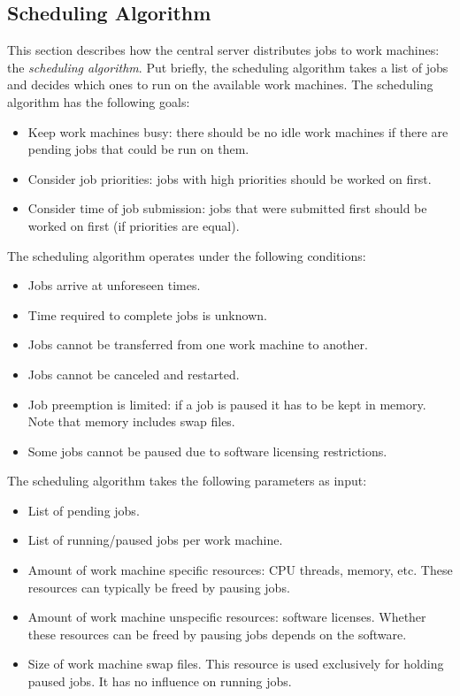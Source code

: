 \subsection{Scheduling Algorithm}
This section describes how the central server distributes jobs to work machines: the \textit{scheduling algorithm}.
Put briefly, the scheduling algorithm takes a list of jobs and decides which ones to run on the available work machines.
The scheduling algorithm has the following goals:
\begin{itemize}
\item Keep work machines busy: there should be no idle work machines if there are pending jobs that could be run on them.
\item Consider job priorities: jobs with high priorities should be worked on first.
\item Consider time of job submission: jobs that were submitted first should be worked on first (if priorities are equal).
\end{itemize}
The scheduling algorithm operates under the following conditions:
\begin{itemize}
\item Jobs arrive at unforeseen times.
\item Time required to complete jobs is unknown.
\item Jobs cannot be transferred from one work machine to another.
\item Jobs cannot be canceled and restarted.
\item Job preemption is limited: if a job is paused it has to be kept in memory.
Note that memory includes swap files.
\item Some jobs cannot be paused due to software licensing restrictions.
\end{itemize}
The scheduling algorithm takes the following parameters as input:
\begin{itemize}
\item List of pending jobs.
\item List of running/paused jobs per work machine.
\item Amount of work machine specific resources: CPU threads, memory, etc.
These resources can typically be freed by pausing jobs.
\item Amount of work machine unspecific resources: software licenses.
Whether these resources can be freed by pausing jobs depends on the software.
\item Size of work machine swap files.
This resource is used exclusively for holding paused jobs.
It has no influence on running jobs.
\end{itemize}
